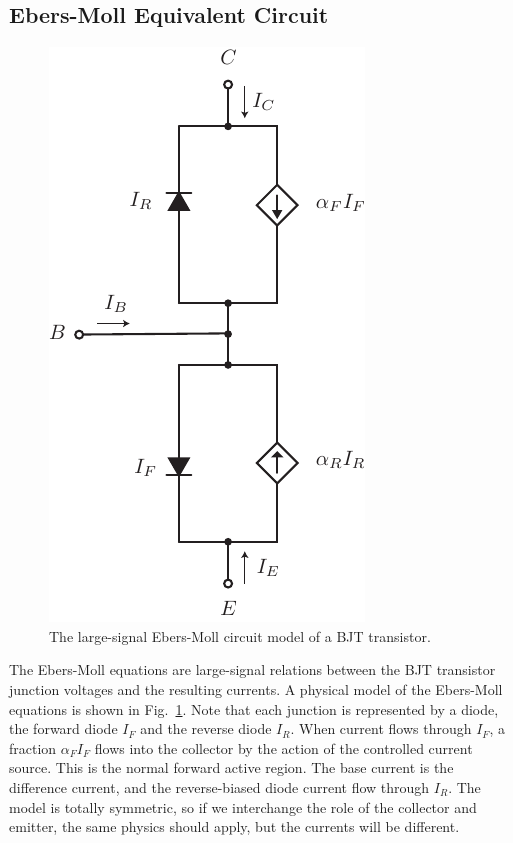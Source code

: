 \subsection{Ebers-Moll Equivalent Circuit}
\begin{figure}[tb]
\begin{center}
\includegraphics[scale=.7]{slide17_ebers_moll}
\end{center}
\caption{The large-signal Ebers-Moll circuit model of a BJT transistor.}
\label{fig:slide17_ebers_moll}
\end{figure}

The Ebers-Moll equations are large-signal relations between the BJT transistor junction voltages and the resulting currents.  A physical model of the Ebers-Moll equations is shown in Fig.~\ref{fig:slide17_ebers_moll}.  Note that each junction is represented by a diode, the forward diode $I_F$ and the reverse diode $I_R$.  When current flows through $I_F$, a fraction $\alpha_F I_F$ flows into the collector by the action of the controlled current source.  This is the normal forward active region. The base current is the difference current, and the reverse-biased diode current flow through $I_R$.  The model is totally symmetric, so if we interchange the role of the collector and emitter, the same physics should apply, but the currents will be different.  
